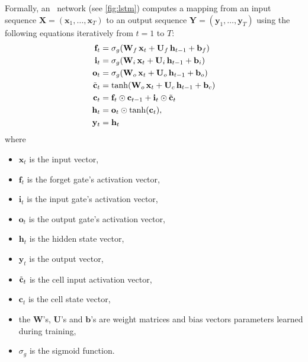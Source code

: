Formally, an \lstm\ network (see \autoref{fig:lstm}) computes a mapping from an input sequence $\mathbf{X} = (\mathbf{x}_1, \dots, \mathbf{x}_T)$ to an output sequence $\mathbf{Y} = (\mathbf{y}_1, \dots, \mathbf{y}_T)$ using the following equations iteratively from $t = 1$ to $T$:
\begin{align*}
    \mathbf{f}_t & = \sigma_g (\mathbf{W}_f \, \mathbf{x}_t + \mathbf{U}_f \, \mathbf{h}_{t-1} + \mathbf{b}_f) \\
    \mathbf{i}_t & = \sigma_g (\mathbf{W}_i \, \mathbf{x}_t + \mathbf{U}_i \, \mathbf{h}_{t-1} + \mathbf{b}_i) \\
    \mathbf{o}_t & = \sigma_g (\mathbf{W}_o \, \mathbf{x}_t + \mathbf{U}_o \, \mathbf{h}_{t-1} + \mathbf{b}_o) \\
    \Tilde{\mathbf{c}}_t & = \tanh (\mathbf{W}_o \, \mathbf{x}_t + \mathbf{U}_c \, \mathbf{h}_{t-1} + \mathbf{b}_c) \\
    \mathbf{c}_t & = \mathbf{f}_t \odot \mathbf{c}_{t-1} + \mathbf{i}_t \odot \Tilde{\mathbf{c}}_t \\
    \mathbf{h}_t & = \mathbf{o}_t \odot \tanh(\mathbf{c}_t) , \\
    \mathbf{y}_t & = \mathbf{h}_t
\end{align*}
where
\begin{itemize}[nolistsep]
    \item $\mathbf{x}_t$ is the input vector,
    \item $\mathbf{f}_t$ is the forget gate's activation vector,
    \item $\mathbf{i}_t$ is the input gate's activation vector,
    \item $\mathbf{o}_t$ is the output gate's activation vector,
    \item $\mathbf{h}_t$ is the hidden state vector,
    \item $\mathbf{y}_t$ is the output vector,
    \item $\Tilde{\mathbf{c}}_t$ is the cell input activation vector,
    \item $\mathbf{c}_t$ is the cell state vector,
    \item the $\mathbf{W}$'s, $\mathbf{U}$'s and $\mathbf{b}$'s are weight matrices and bias vectors parameters learned during training,
    \item $\sigma_g$ is the sigmoid function.
\end{itemize}

